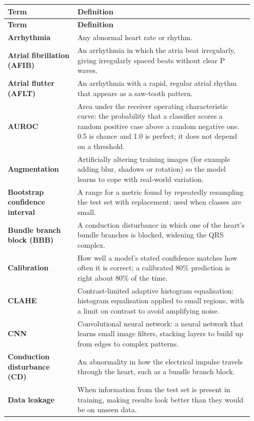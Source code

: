 \begingroup
\small
\renewcommand{\arraystretch}{1.5}
\begin{longtable}{@{}>{\raggedright\arraybackslash}p{0.27\linewidth} p{0.68\linewidth}@{}}
  \toprule
  \textbf{Term} & \textbf{Definition} \\
  \midrule
  \endfirsthead
  \toprule
  \textbf{Term} & \textbf{Definition} \\
  \midrule
  \endhead
  \bottomrule
  \endfoot
  \textbf{Arrhythmia} & Any abnormal heart rate or rhythm. \\
  \textbf{Atrial fibrillation (AFIB)} & An arrhythmia in which the atria beat irregularly, giving irregularly spaced beats without clear P waves. \\
  \textbf{Atrial flutter (AFLT)} & An arrhythmia with a rapid, regular atrial rhythm that appears as a saw-tooth pattern. \\
  \textbf{AUROC} & Area under the receiver operating characteristic curve: the probability that a classifier scores a random positive case above a random negative one. 0.5 is chance and 1.0 is perfect; it does not depend on a threshold. \\
  \textbf{Augmentation} & Artificially altering training images (for example adding blur, shadows or rotation) so the model learns to cope with real-world variation. \\
  \textbf{Bootstrap confidence interval} & A range for a metric found by repeatedly resampling the test set with replacement; used when classes are small. \\
  \textbf{Bundle branch block (BBB)} & A conduction disturbance in which one of the heart's bundle branches is blocked, widening the QRS complex. \\
  \textbf{Calibration} & How well a model's stated confidence matches how often it is correct; a calibrated 80\% prediction is right about 80\% of the time. \\
  \textbf{CLAHE} & Contrast-limited adaptive histogram equalisation: histogram equalisation applied to small regions, with a limit on contrast to avoid amplifying noise. \\
  \textbf{CNN} & Convolutional neural network: a neural network that learns small image filters, stacking layers to build up from edges to complex patterns. \\
  \textbf{Conduction disturbance (CD)} & An abnormality in how the electrical impulse travels through the heart, such as a bundle branch block. \\
  \textbf{Data leakage} & When information from the test set is present in training, making results look better than they would be on unseen data. \\

\end{longtable}
